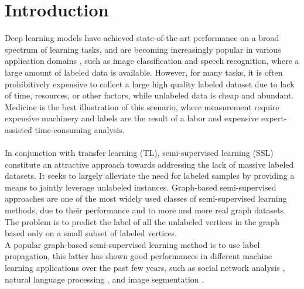 \documentclass[conference]{IEEEtran}
\begin{document}
\section{Introduction}
\setlength{\parindent}{0em}
Deep learning models have achieved state-of-the-art performance on a broad spectrum of learning tasks, and are becoming increasingly popular in various application domains \cite{lecun2015deep}, such
as image classification 
and speech recognition,
where a large amount of labeled data is available. However, for many tasks, it is often prohibitively expensive to collect a large high quality labeled dataset due to lack of time, resources, or other factors, while unlabeled data is cheap and abundant. Medicine is the best illustration of this scenario, where measurement require expensive machinery and labels are the result of a labor and expensive expert-assisted time-consuming analysis. 
\\
\\ In conjunction with transfer learning (TL), semi-supervised learning (SSL) constitute an attractive approach towards addressing the lack of massive labeled datasets. It seeks to largely alleviate the need for labeled samples by providing a means to jointly leverage unlabeled instances. Graph-based semi-supervised approaches are one of the most widely used classes of semi-supervised learning methods, due to their performance and to more and more real graph datasets. The problem is to predict the label of all the unlabeled vertices in the graph based only on a small subset of labeled vertices.
\\A popular graph-based semi-supervised learning method is to use label propagation, this latter has shown good performances in different machine learning applications over the past few years, such as social network analysis \cite{boldi2011layered}  \cite{zhang2017label}, natural language processing \cite{barba2020mulan}, and image segmentation  
\cite{breve2019interactive}.
\\
\end{document}
